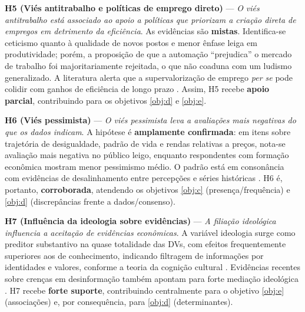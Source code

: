 \textbf{H5 (Viés antitrabalho e políticas de emprego direto)} — \textit{O viés antitrabalho está associado ao apoio a políticas que priorizam a criação direta de empregos em detrimento da eficiência}. As evidências são \textbf{mistas}. Identifica-se ceticismo quanto à qualidade de novos postos e menor ênfase leiga em produtividade; porém, a proposição de que a automação “prejudica” o mercado de trabalho foi majoritariamente rejeitada, o que não coaduna com um ludismo generalizado. A literatura alerta que a supervalorização de emprego \emph{per se} pode colidir com ganhos de eficiência de longo prazo \cite{landsburg2012armchair,sowell2007conflict}. Assim, H5 recebe \textbf{apoio parcial}, contribuindo para os objetivos \autoref{obj:d} e \autoref{obj:e}.

\textbf{H6 (Viés pessimista)} — \textit{O viés pessimista leva a avaliações mais negativas do que os dados indicam}. A hipótese é \textbf{amplamente confirmada}: em itens sobre trajetória de desigualdade, padrão de vida e rendas relativas a preços, nota-se avaliação mais negativa no público leigo, enquanto respondentes com formação econômica mostram menor pessimismo médio. O padrão está em consonância com evidências de desalinhamento entre percepções e séries históricas \cite{easterbrook2004progress, ridleyotimista}. H6 é, portanto, \textbf{corroborada}, atendendo os objetivos \autoref{obj:c} (presença/frequência) e \autoref{obj:d} (discrepâncias frente a dados/consenso).

\textbf{H7 (Influência da ideologia sobre evidências)} — \textit{A filiação ideológica influencia a aceitação de evidências econômicas}. A variável ideologia surge como preditor substantivo na quase totalidade das DVs, com efeitos frequentemente superiores aos de conhecimento, indicando filtragem de informações por identidades e valores, conforme a teoria da cognição cultural \cite{kahan2012polarization}. Evidências recentes sobre crenças em desinformação também apontam para forte mediação ideológica \cite{rossini2023explaining}. H7 recebe \textbf{forte suporte}, contribuindo centralmente para o objetivo \autoref{obj:e} (associações) e, por consequência, para \autoref{obj:d} (determinantes).

